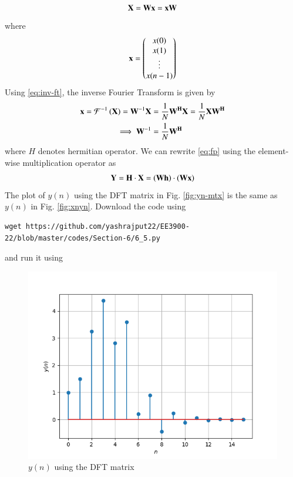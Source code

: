 \documentclass[journal,12pt,twocolumn]{IEEEtran}
\renewcommand\thesection{\arabic{section}}
\begin{document}
\begin{enumerate}[label=\thesection.\arabic*]
\begin{align}
	\mathbf{X} = \mathbf{W}\mathbf{x} = \mathbf{x}\mathbf{W}
\end{align}
\noindent where
\begin{align}
	\mathbf{x} = 
	\begin{pmatrix}
		x(0) \\ x(1) \\ \vdots \\ x(n - 1)
	\end{pmatrix}
\end{align}
\noindent Using \eqref{eq:inv-ft}, the inverse Fourier Transform is given by
\begin{align}
	\mathbf{x} = \mathcal{F}^{-1}\left(\mathbf{X}\right) = \mathbf{W}^{-1}\mathbf{X} &= 
	\frac{1}{N}\mathbf{W^{H}}\mathbf{X} = \frac{1}{N}\mathbf{X}\mathbf{W^{H}} \\ 
	\implies \mathbf{W}^{-1} &= \frac{1}{N}\mathbf{W^{H}}
\end{align}
\noindent where $H$ denotes hermitian operator. We can rewrite \eqref{eq:fp} using the
element-wise multiplication operator as
\begin{align}
	\mathbf{Y} = \mathbf{H}\cdot\mathbf{X} = \left(\mathbf{W}\mathbf{h}\right)\cdot\left(\mathbf{W}\mathbf{x}\right)
\end{align}
The plot of $y(n)$ using the DFT matrix in Fig. \eqref{fig:yn-mtx} is the same as $y(n)$ in 
Fig. \eqref{fig:xnyn}. Download the code using
\begin{lstlisting}
wget https://github.com/yashrajput22/EE3900-22/blob/master/codes/Section-6/6_5.py
\end{lstlisting}
and run it using

\begin{figure}[!htb]
	\centering
	\includegraphics[width=\columnwidth]{./figs/6_5.png}
	\caption{$y(n)$ using the DFT matrix}
	\label{fig:yn-mtx}
\end{figure}
\end{enumerate}
%
\end{document}
